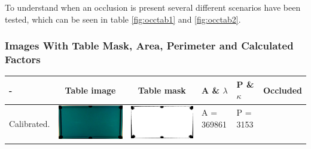To understand when an occlusion is present several different scenarios have been tested, which can be seen in table \ref{fig:occtab1} and  \ref{fig:occtab2}.

\subsubsection{Images With Table Mask, Area, Perimeter and Calculated Factors}
\begin{table}[H]
\begin{tabular}{|l|c|c|l|l|c|}

\hline - & Table image & Table mask & A \& $\lambda$ & P \& $\kappa$ & Occluded \\ 
\hline

\multirow{4}{*}{Calibrated.} & \multirow{4}{*}{\includegraphics[scale=0.08]{../images/1/calibimg.png}} & \multirow{4}{*}{\includegraphics[scale=0.08]{../images/1/calibmask.png}} & A = 369861 & P = 3153  & \multirow{4}{*}{}\\  
& & & & & \\
&&&&&\\
&&&&&\\
\hline


\end{tabular}
\end{table}
